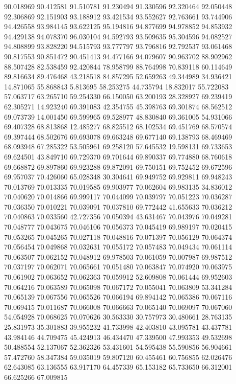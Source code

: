 90.018969
90.412581
91.510781
91.230494
91.330596
92.320464
92.050448
92.306869
92.151903
93.188912
93.421534
93.552627
92.763661
93.744906
94.426558
93.984145
93.622125
95.194816
94.877699
94.978852
94.853932
94.429138
94.078370
96.030104
94.592793
93.509635
95.304596
94.082527
94.808899
93.828220
94.515793
93.777797
93.796816
92.792537
93.061468
90.817553
90.851472
90.451413
94.477166
94.079607
90.963702
88.902962
88.507428
82.538459
92.420844
78.958799
88.764998
70.839118
60.114649
89.816634
89.476468
43.218518
84.857295
52.659263
49.344989
34.936421
14.871065
55.868843
5.813695
58.253275
44.735794
18.832017
55.722083
57.063717
63.265710
59.254330
66.150050
63.200193
28.328927
69.239419
62.305271
14.923240
69.391083
42.354755
45.398763
69.301874
68.562512
69.073739
14.001450
69.599965
69.528977
48.830840
69.361005
54.931066
69.407328
68.813868
12.485277
68.825512
68.102534
69.451769
68.570574
69.397444
68.502676
69.693078
69.663248
69.677140
69.138793
68.469469
68.093948
67.285322
53.505961
69.258120
57.645532
19.598131
69.733653
69.624501
43.849710
69.729370
69.701644
69.890337
69.774880
68.760618
69.668872
69.897860
69.923288
69.872091
69.750151
69.752452
69.672596
69.957037
70.426060
65.028348
30.304641
69.949752
69.929811
69.948243
70.013769
70.013335
70.019585
69.903977
70.062604
69.983135
34.836012
70.040620
70.014866
69.999117
70.044099
70.039797
70.051223
70.036287
70.036350
70.010221
70.039091
70.037810
69.772442
41.655633
70.036212
70.040863
70.033560
42.727356
70.050394
43.631467
70.043976
70.049281
70.048777
70.043675
70.046106
70.056373
70.045419
69.989197
70.020415
70.053265
70.045265
70.027118
70.048816
70.071397
70.056129
70.064374
70.056454
70.049868
70.032631
70.055172
70.057483
70.049434
70.061114
70.063507
70.062152
70.048912
69.978503
70.061059
70.007987
69.987512
70.037197
70.062071
70.065661
70.051480
70.063847
70.074920
70.063975
70.061902
70.063652
70.062363
70.059912
52.609808
70.061444
69.952603
70.064216
70.063589
70.065098
70.067172
70.055041
70.063809
53.341284
70.065139
70.067556
70.065526
70.066194
69.894142
70.065386
70.067116
70.069415
70.011687
70.066008
70.066663
70.065140
70.069097
70.067060
54.054928
70.068625
70.070626
30.563330
30.757973
30.480661
28.763135
25.831973
35.301883
39.955232
41.733998
42.403810
43.095781
43.437781
43.984146
44.709475
45.424913
46.434470
47.339500
47.993353
49.532698
50.488554
52.137067
52.362326
53.431601
54.595438
55.590856
56.904661
57.472760
58.347384
59.035019
59.807120
60.455461
60.756855
62.026476
62.643085
63.136555
63.917170
64.457339
65.153182
65.733650
66.312001
66.625266
67.009815
